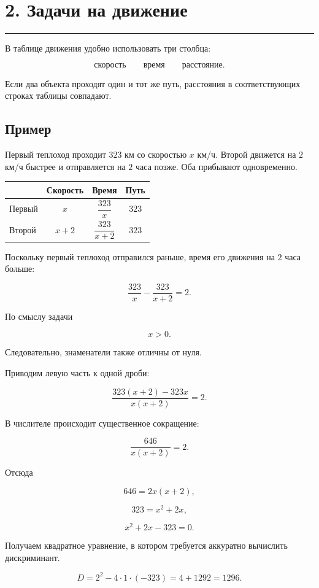 \documentclass[a4paper,12pt]{article}
\newcommand{\checksection}[1]{%
  \section*{\color{darkaccent}#1}
  \vspace{-0.6em}
  {\color{accent!70}\rule{\linewidth}{0.6pt}}
  \vspace{0.35em}
}
\begin{document}
\checksection{2. Задачи на движение}

В таблице движения удобно использовать три столбца:

\[
\boxed{\text{скорость}}
\qquad
\boxed{\text{время}}
\qquad
\boxed{\text{расстояние}}.
\]

Если два объекта проходят один и тот же путь, расстояния в соответствующих строках таблицы совпадают.

\subsection*{\color{darkaccent}Пример}

Первый теплоход проходит \(323\) км со скоростью \(x\) км/ч. Второй движется на \(2\) км/ч быстрее и отправляется на \(2\) часа позже. Оба прибывают одновременно.

\begin{table}[ht]
\centering
\begin{tabularx}{0.88\linewidth}{@{}lccc@{}}
\toprule
& \textbf{Скорость} & \textbf{Время} & \textbf{Путь} \\
\midrule
Первый
&
\(x\)
&
\(\dfrac{323}{x}\)
&
\(323\)
\\[2mm]
Второй
&
\(x+2\)
&
\(\dfrac{323}{x+2}\)
&
\(323\)
\\
\bottomrule
\end{tabularx}
\end{table}

Поскольку первый теплоход отправился раньше, время его движения на \(2\) часа больше:

\[
\frac{323}{x}-\frac{323}{x+2}=2.
\]

По смыслу задачи

\[
x>0.
\]

Следовательно, знаменатели также отличны от нуля.

Приводим левую часть к одной дроби:

\[
\frac{323(x+2)-323x}{x(x+2)}=2.
\]

В числителе происходит существенное сокращение:

\[
\frac{646}{x(x+2)}=2.
\]

Отсюда

\[
646=2x(x+2),
\]

\[
323=x^2+2x,
\]

\[
x^2+2x-323=0.
\]

Получаем квадратное уравнение, в котором требуется аккуратно вычислить дискриминант.

\[
D=2^2-4\cdot1\cdot(-323)
 =4+1292
 =1296.
\]
\end{document}
